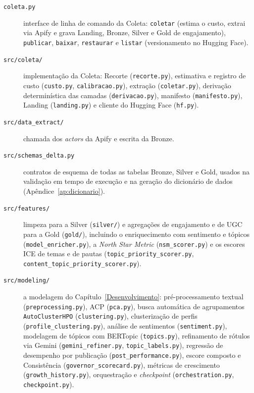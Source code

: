 \begin{description}
    \item[\texttt{coleta.py}] interface de linha de comando da Coleta: \texttt{coletar} (estima o custo, extrai via Apify e grava Landing, Bronze, Silver e Gold de engajamento), \texttt{publicar}, \texttt{baixar}, \texttt{restaurar} e \texttt{listar} (versionamento no Hugging Face).
    \item[\texttt{src/coleta/}] implementação da Coleta: Recorte (\texttt{recorte.py}), estimativa e registro de custo (\texttt{custo.py}, \texttt{calibracao.py}), extração (\texttt{coletar.py}), derivação determinística das camadas (\texttt{derivacao.py}), manifesto (\texttt{manifesto.py}), Landing (\texttt{landing.py}) e cliente do Hugging Face (\texttt{hf.py}).
    \item[\texttt{src/data\_\allowbreak{}extract/}] chamada dos \emph{actors} da Apify e escrita da Bronze.
    \item[\texttt{src/schemas\_\allowbreak{}delta.py}] contratos de esquema de todas as tabelas Bronze, Silver e Gold, usados na validação em tempo de execução e na geração do dicionário de dados (Apêndice~\ref{ap:dicionario}).
    \item[\texttt{src/features/}] limpeza para a Silver (\texttt{silver/}) e agregações de engajamento e de UGC para a Gold (\texttt{gold/}), incluindo o enriquecimento com sentimento e tópicos (\texttt{model\_\allowbreak{}enricher.py}), a \emph{North Star Metric} (\texttt{nsm\_\allowbreak{}scorer.py}) e os escores ICE de temas e de pautas (\texttt{topic\_\allowbreak{}priority\_\allowbreak{}scorer.py}, \texttt{content\_\allowbreak{}topic\_\allowbreak{}priority\_\allowbreak{}scorer.py}).
    \item[\texttt{src/modeling/}] a modelagem do Capítulo~\ref{Desenvolvimento}: pré-processamento textual (\texttt{preprocessing.py}), ACP (\texttt{pca.py}), busca automática de agrupamentos \texttt{AutoClusterHPO} (\texttt{clustering.py}), clusterização de perfis (\texttt{profile\_\allowbreak{}clustering.py}), análise de sentimentos (\texttt{sentiment.py}), modelagem de tópicos com BERTopic (\texttt{topics.py}), refinamento de rótulos via Gemini (\texttt{gemini\_\allowbreak{}refiner.py}, \texttt{topic\_\allowbreak{}labels.py}), regressão de desempenho por publicação (\texttt{post\_\allowbreak{}performance.py}), escore composto e Consistência (\texttt{governor\_\allowbreak{}scorecard.py}), métricas de crescimento (\texttt{growth\_\allowbreak{}history.py}), orquestração e \emph{checkpoint} (\texttt{orchestration.py}, \texttt{checkpoint.py}).

\end{description}

